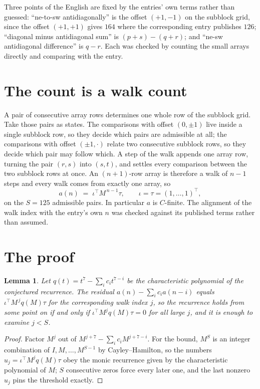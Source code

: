 \documentclass[11pt,a4paper]{article}
\theoremstyle{plain}
\newtheorem{lemma}[theorem]{Lemma}
\theoremstyle{definition}
\begin{document}
Three points of the English are fixed by the entries' own terms rather than guessed:
``ne-to-sw antidiagonally'' is the offset $(+1,-1)$ on the subblock grid, since the offset
$(+1,+1)$ gives $164$ where the corresponding entry publishes $126$; ``diagonal minus
antidiagonal sum'' is $(p+s)-(q+r)$; and ``ne-sw antidiagonal difference'' is $q-r$. Each was
checked by counting the small arrays directly and comparing with the entry.

\section{The count is a walk count}

A pair of consecutive array rows determines one whole row of the subblock grid. Take those
pairs as states. The comparisons with offset $(0,\pm1)$ live inside a single subblock row, so
they decide which pairs are admissible at all; the comparisons with offset $(\pm1,\cdot)$
relate two consecutive subblock rows, so they decide which pair may follow which. A step of the
walk appends one array row, turning the pair $(r,s)$ into $(s,t)$, and settles every comparison
between the two subblock rows at once. An $(n+1)$-row array is therefore a walk of $n-1$ steps
and every walk comes from exactly one array, so
\[
a(n)\;=\;\iota^{\!\top}M^{\,n-1}\tau,\qquad \iota=\tau=(1,\dots,1)^{\!\top},
\]
on the $S=125$ admissible pairs. In particular $a$ is $C$-finite. The alignment of the walk
index with the entry's own $n$ was checked against its published terms rather than assumed.

\section{The proof}

\begin{lemma}\label{lem:crit}
Let $q(t)=t^{7}-\sum_i c_it^{7-i}$ be the characteristic polynomial of the
conjectured recurrence. The residual $a(n)-\sum_ic_ia(n-i)$ equals
$\iota^{\!\top}M^{\,j}q(M)\tau$ for the corresponding walk index $j$, so the recurrence
holds from some point on if and only if $\iota^{\!\top}M^{j}q(M)\tau=0$ for all large $j$,
and it is enough to examine $j<S$.
\end{lemma}

\begin{proof}
Factor $M^{j}$ out of $M^{j+7}-\sum_ic_iM^{j+7-i}$. For the bound, $M^{S}$
is an integer combination of $I,M,\dots,M^{S-1}$ by Cayley--Hamilton, so the numbers
$u_j=\iota^{\!\top}M^{j}q(M)\tau$ obey the monic recurrence given by the characteristic
polynomial of $M$; $S$ consecutive zeros force every later one, and the last nonzero $u_j$
pins the threshold exactly.
\end{proof}
\end{document}
